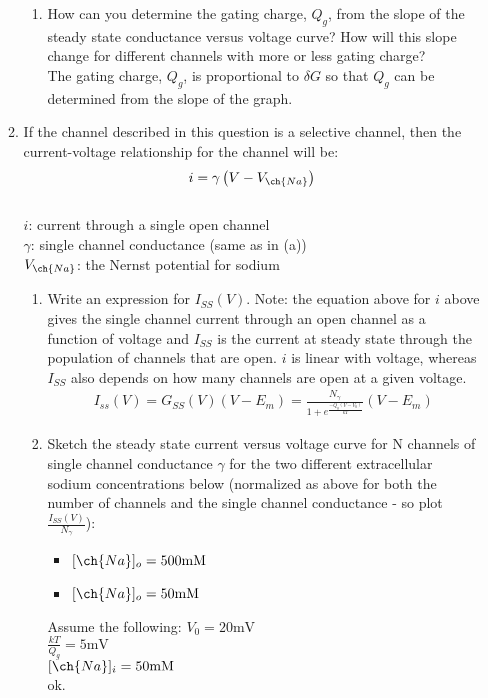 \documentclass[11pt]{article}
\begin{document}
\begin{enumerate}[label=\arabic*.]
\begin{enumerate}[label=(\alph*)]
\begin{enumerate}[label=(\roman*)]
\item
How can you determine the gating charge, $Q_g$, from the slope of the steady state conductance versus voltage curve? How will this slope change for different channels with more or less gating charge?
\vspace*{1\baselineskip}
\\
The gating charge, $Q_g$, is proportional to $\delta G$ so that $Q_g$ can be determined from the slope of the graph.



\end{enumerate}
\item
If the channel described in this question is a  selective channel, then the current-voltage relationship for the \underline{} channel will be:
\begin{align*}
i = \gamma \left(V - V_{\ch{Na}}\right)
\end{align*}
\underline{}
\\
$i$: current through a single open channel \\
$\gamma$: single channel conductance (same as in (a)) \\
$V_{\ch{Na}}$: the Nernst potential for sodium
\begin{enumerate}[label=(\roman*)]
\item
Write an expression for $I_{SS}(V)$. Note: the equation above for $i$ above gives the single channel current through an open channel as a function of voltage and $I_{SS}$ is the current at steady state through the population of channels that are open. $i$ is linear with voltage, whereas $I_{SS}$ also depends on how many channels are open at a given voltage. 
\begin{align*}
I_{ss}(V) = G_{SS}(V) (V - E_m) = \frac{N_{\gamma}} {1 + e ^ {\frac{-Q_g(V - V_0)} {k T}}} (V - E_m)
\end{align*}



\item
Sketch the steady state current versus voltage curve for N channels of single channel conductance $\gamma$ for the two different extracellular sodium concentrations below (normalized as above for both the number of channels and the single channel conductance - so plot $\frac{I_{SS}(V)} {N_{\gamma}}$):
\begin{itemize}
\item
$[\ch{Na}]_o = 500 \text{mM}$
\item
$[\ch{Na}]_o = 50 \text{mM}$
\end{itemize}
Assume the following:
$V_0 = 20 \text{mV}$ \\
$\frac{kT} {Q_g} = 5 \text{mV}$ \\
$[\ch{Na}]_i = 50 \text{mM}$
\vspace*{1\baselineskip}
\\
ok.




\end{enumerate}
\end{enumerate}
\end{enumerate}
\end{document}
